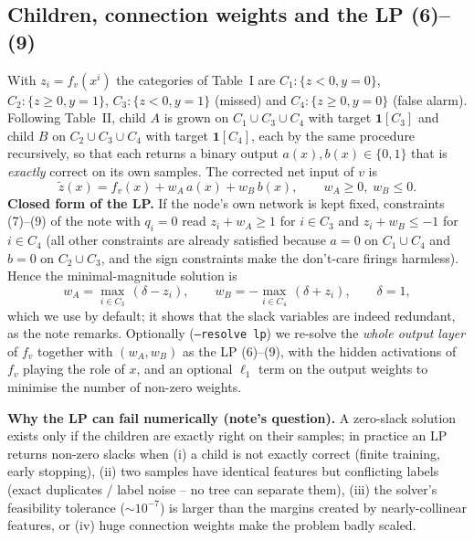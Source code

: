 \subsection{Children, connection weights and the LP (6)--(9)}
With $z_i=f_v(x^i)$ the categories of Table~I are $C_1:\{z<0,y=0\}$, $C_2:\{z\ge 0,y=1\}$,
$C_3:\{z<0,y=1\}$ (missed) and $C_4:\{z\ge 0,y=0\}$ (false alarm). Following Table~II,
child $A$ is grown on $C_1\cup C_3\cup C_4$ with target $\mathbf{1}[C_3]$ and child $B$ on
$C_2\cup C_3\cup C_4$ with target $\mathbf{1}[C_4]$, each by the same procedure recursively, so that
each returns a binary output $a(x),b(x)\in\{0,1\}$ that is \emph{exactly} correct on its own samples.
The corrected net input of $v$ is
\begin{equation}
  \tilde z(x)=f_v(x)+w_A\,a(x)+w_B\,b(x),\qquad w_A\ge 0,\; w_B\le 0. \label{eq:corr}
\end{equation}
\textbf{Closed form of the LP.} If the node's own network is kept fixed, constraints (7)--(9) of the
note with $q_i=0$ read $z_i+w_A\ge 1$ for $i\in C_3$ and $z_i+w_B\le -1$ for $i\in C_4$ (all other
constraints are already satisfied because $a=0$ on $C_1\cup C_4$ and $b=0$ on $C_2\cup C_3$, and the
sign constraints make the don't-care firings harmless). Hence the minimal-magnitude solution is
\begin{equation}
  w_A=\max_{i\in C_3}\,(\delta-z_i),\qquad w_B=-\max_{i\in C_4}\,(\delta+z_i),\qquad \delta=1, \label{eq:closed}
\end{equation}
which we use by default; it shows that the slack variables are indeed redundant, as the note remarks.
Optionally (\texttt{--resolve lp}) we re-solve the \emph{whole output layer} of $f_v$ together with
$(w_A,w_B)$ as the LP (6)--(9), with the hidden activations of $f_v$ playing the role of $x$, and
an optional $\ell_1$ term on the output weights to minimise the number of non-zero weights.

\textbf{Why the LP can fail numerically (note's question).} A zero-slack solution exists only if the
children are exactly right on their samples; in practice an LP returns non-zero slacks when (i) a
child is not exactly correct (finite training, early stopping), (ii) two samples have identical
features but conflicting labels (exact duplicates / label noise -- no tree can separate them),
(iii) the solver's feasibility tolerance ($\sim10^{-7}$) is larger than the margins created by
nearly-collinear features, or (iv) huge connection weights make the problem badly scaled.

